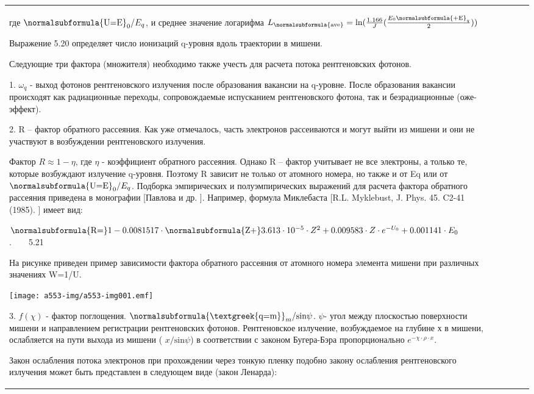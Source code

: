 \documentclass[a4paper,14pt, openany, twoside, draft]{extbook} %
\begin{document}
\begin{flushleft}
\begin{supertabular}{|m{1.7279999cm}|m{1.522cm}|m{1.522cm}|m{1.522cm}|m{1.744cm}|}
где  $\normalsubformula{\text{U=E}}_0/E_q$, и среднее значение логарифма  $L_{\normalsubformula{\text{ave}}}=\text{ln}(\frac{1.166} J(\frac{E_0\normalsubformula{\text{+E}}_q} 2))$

Выражение 5.20 определяет число ионизаций q{}-уровня вдоль траектории в мишени.

Следующие три фактора (множителя) необходимо также учесть для расчета потока рентгеновских фотонов.

1.  $\omega _q$ - выход фотонов рентгеновского излучения после образования вакансии на q{}-уровне. После образования вакансии происходят как радиационные переходы, сопровождаемые испусканием рентгеновского фотона, так  и безрадиационные (оже-эффект).

2. R – фактор обратного рассеяния. Как уже отмечалось, часть электронов рассеиваются и могут выйти из мишени и они не участвуют в возбуждении рентгеновского излучения.

Фактор  $R\approx 1-\eta $, где  $\eta $ - коэффициент обратного рассеяния. Однако R – фактор учитывает не все электроны, а только те, которые возбуждают излучение q{}-уровня. Поэтому R зависит не только от атомного номера, но также и от Eq или от  $\normalsubformula{\text{U=E}}_0/E_q$. Подборка эмпирических и полуэмпирических выражений для расчета фактора  обратного рассеяния приведена в монографии [Павлова и др. ]. Например, формула Миклебаста [R.L. Myklebust, J. Phys. 45. C2-41 (1985). ] имеет вид:

 $\normalsubformula{\text{R=}}1-0.0081517\cdot \normalsubformula{\text{Z+}}3.613\cdot 10^{-5}\cdot Z^2+0.009583\cdot Z\cdot e^{-U_0}+0.001141\cdot E_0$.\ \ \ \ 5.21

На рисунке приведен пример зависимости фактора обратного рассеяния от атомного номера элемента мишени при различных значениях W=1/U.

 \texttt{[image: a553-img/a553-img001.emf]}

3.  $f(\chi )$ - фактор поглощения.   $\normalsubformula{\text{\textgreek{q=m}}}_m\text{/sin}\psi $.  $\psi ${}- угол между плоскостью поверхности мишени и направлением регистрации рентгеновских фотонов. Рентгеновское излучение, возбуждаемое на глубине х в мишени, ослабляется на пути выхода из мишени ( $x\text{/sin}\psi $) в соответствии с законом Бугера-Бэра пропорционально  $e^{-\chi \cdot \rho \cdot x}$.

Закон ослабления потока электронов при прохождении через тонкую пленку подобно закону ослабления рентгеновского излучения может быть представлен в следующем виде (закон Ленарда):


\end{supertabular}
\end{flushleft}
\end{document}
